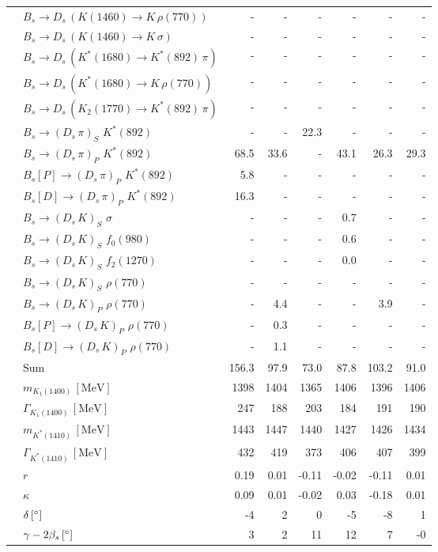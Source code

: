 \begin{tabular}{l l  r  r  r  r  r  r  }
 & $B_s \to D_s \, ( K(1460) \to K \, \rho(770) )$ & -  & -  & -  & -  & -  & -  \\ 
 & $B_s \to D_s \, ( K(1460) \to K \, \sigma )$ & -  & -  & -  & -  & -  & -  \\ 
 & $B_s \to D_s \, ( K^{*}(1680) \to K^{*}(892) \, \pi )$ & -  & -  & -  & -  & -  & -  \\ 
 & $B_s \to D_s \, ( K^{*}(1680) \to K \, \rho(770) )$ & -  & -  & -  & -  & -  & -  \\ 
 & $B_s \to D_s \, ( K_2(1770) \to K^{*}(892) \, \pi )$ & -  & -  & -  & -  & -  & -  \\ 
 & $B_s \to ( D_s \, \pi)_{S} \, \, K^{*}(892)$ & -  & -  & 22.3 & -  & -  & -  \\ 
 & $B_s \to ( D_s \, \pi)_{P} \, \, K^{*}(892)$ & 68.5 & 33.6 & -  & 43.1 & 26.3 & 29.3 \\ 
 & $B_s[P] \to ( D_s \, \pi)_{P} \, \, K^{*}(892)$ & 5.8 & -  & -  & -  & -  & -  \\ 
 & $B_s[D] \to ( D_s \, \pi)_{P} \, \, K^{*}(892)$ & 16.3 & -  & -  & -  & -  & -  \\ 
 & $B_s \to ( D_s \, K)_{S} \, \, \sigma$ & -  & -  & -  & 0.7 & -  & -  \\ 
 & $B_s \to ( D_s \, K)_{S} \, \, f_0(980)$ & -  & -  & -  & 0.6 & -  & -  \\ 
 & $B_s \to ( D_s \, K)_{S} \, \, f_2(1270)$ & -  & -  & -  & 0.0 & -  & -  \\ 
 & $B_s \to ( D_s \, K)_{S} \, \, \rho(770)$ & -  & -  & -  & -  & -  & -  \\ 
 & $B_s \to ( D_s \, K)_{P} \, \, \rho(770)$ & -  & 4.4 & -  & -  & 3.9 & -  \\ 
 & $B_s[P] \to ( D_s \, K)_{P} \, \, \rho(770)$ & -  & 0.3 & -  & -  & -  & -  \\ 
 & $B_s[D] \to ( D_s \, K)_{P} \, \, \rho(770)$ & -  & 1.1 & -  & -  & -  & -  \\ 
 & $\text{Sum}$ & 156.3 & 97.9 & 73.0 & 87.8 & 103.2 & 91.0 \\ 
\hline
 & $m_{K_1(1400)} \, [\text{MeV}]$ & 1398 & 1404 & 1365 & 1406 & 1396 & 1406 \\ 
 & $\Gamma_{K_1(1400)} \, [\text{MeV}]$ & 247 & 188 & 203 & 184 & 191 & 190 \\ 
 & $m_{K^{*}(1410)} \, [\text{MeV}]$ & 1443 & 1447 & 1440 & 1427 & 1426 & 1434 \\ 
 & $\Gamma_{K^{*}(1410)} \, [\text{MeV}]$ & 432 & 419 & 373 & 406 & 407 & 399 \\ 
 & $r$ & 0.19 & 0.01 & -0.11 & -0.02 & -0.11 & 0.01 \\ 
 & $\kappa$ & 0.09 & 0.01 & -0.02 & 0.03 & -0.18 & 0.01 \\ 
 & $\delta \, [^{\circ}]$ & -4 & 2 & 0 & -5 & -8 & 1 \\ 
 & $\gamma - 2 \beta_{s} \, [^{\circ}]$ & 3 & 2 & 11 & 12 & 7 & -0 \\ 
\hline
\hline
\end{tabular}
